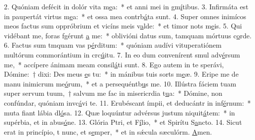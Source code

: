 2. Quóniam defécit in dolór vita m\uline{e}a:~* et anni mei in gm\uline{í}tibus.
3. Infirmáta est in paupertát virtus m\uline{e}a:~* et ossa mea contrb\uline{á}ta sunt.
4. Super omnes inimícos meos factus sum oppróbrium et vicíns meis v\uline{a}lde:~* et timor nots m\uline{e}is.
5. Qui vidébant me, foras fgérunt \uline{a} me:~* oblivióni datus sum, tamquam mórtuus  c\uline{o}rde.
6. Factus sum tmquam vas p\uline{é}rditum:~* quóniam audívi vituperatiónem multórum commorántium in crc\uline{ú}itu.
7. In eo dum convenírent smul adv\uline{é}rsum me,~* accípere ánimam meam consil\uline{á}ti sunt.
8. Ego autem in te sperávi, Dómine:~† dixi: Des meus \uline{e}s tu:~* in mánibus tuis sorts m\uline{e}æ.
9. Eripe me de manu inimicrum me\uline{ó}rum,~* et a persequéntb\uline{u}s me.
10. Illústra fáciem tuam super servum tuum,~† salvum me fac in misericrdia t\uline{u}a:~* Dómine, non confúndar, quóniam invc\uline{á}vi te.
11. Erubéscant ímpii, et deducántr in inf\uline{é}rnum:~* muta fiant lábia dl\uline{ó}sa.
12. Quæ loquúntur advérsus justum niquit\uline{á}tem:~* in supérbia, et in abus\uline{ó}ne.
13. Glória Ptri, et F\uline{í}lio,~* et Spirítu S\uline{a}ncto.
14. Sicut erat in princípio, t nunc, et s\uline{e}mper,~* et in sǽcula sæculórm. \uline{A}men.
